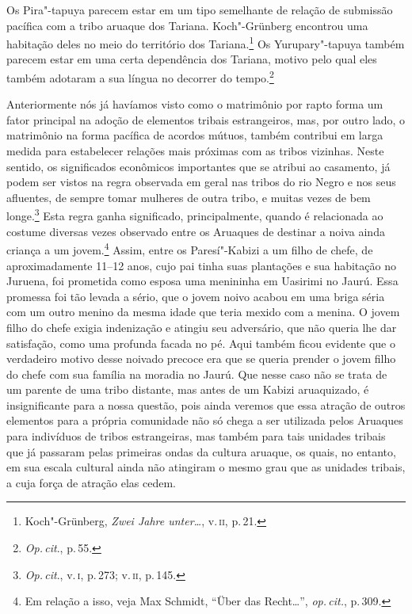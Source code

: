Os Pira"-tapuya parecem estar em um tipo semelhante de relação de
submissão pacífica com a tribo aruaque dos Tariana. Koch"-Grünberg
encontrou uma habitação deles no meio do território dos
Tariana.\footnote{Koch"-Grünberg, \textit{Zwei Jahre unter\ldots},
  v.\,\textsc{ii}, p.\,21.} Os Yurupary"-tapuya também parecem estar em uma certa
dependência dos Tariana, motivo pelo qual eles também adotaram a sua
língua no decorrer do tempo.\footnote{\textit{Op.\,cit}., p.\,55.}

Anteriormente nós já havíamos visto como o matrimônio por rapto forma um
fator principal na adoção de elementos tribais estrangeiros, mas, por
outro lado, o matrimônio na forma pacífica de acordos mútuos, também
contribui em larga medida para estabelecer relações mais próximas com as
tribos vizinhas. Neste sentido, os significados econômicos importantes
que se atribui ao casamento, já podem ser vistos na regra observada em
geral nas tribos do rio Negro e nos seus afluentes, de sempre tomar
mulheres de outra tribo, e muitas vezes de bem longe.\footnote{\textit{Op.\,cit}.,
  v.\,\textsc{i}, p.\,273; v.\,\textsc{ii}, p.\,145.} Esta regra ganha significado,
principalmente, quando é relacionada ao costume diversas vezes observado
entre os Aruaques de destinar a noiva ainda criança a um jovem.\footnote{Em
  relação a isso, veja Max Schmidt, ``Über das Recht\ldots'', \textit{op.\,cit.}, p.\,309.} Assim, entre os
Paresí"-Kabizi a um filho de chefe, de aproximadamente 11--12 anos, cujo
pai tinha suas plantações e sua habitação no Juruena, foi prometida
como esposa uma menininha em Uasirimi no Jaurú. Essa promessa foi tão
levada a sério, que o jovem noivo acabou em uma briga séria com um outro
menino da mesma idade que teria mexido com a menina. O jovem filho do
chefe exigia indenização e atingiu seu adversário, que não queria lhe
dar satisfação, como uma profunda facada no pé. Aqui também ficou
evidente que o verdadeiro motivo desse noivado precoce era que se queria
prender o jovem filho do chefe com sua família na moradia no Jaurú. Que
nesse caso não se trata de um parente de uma tribo distante, mas antes
de um Kabizi aruaquizado, é insignificante para a nossa questão, pois
ainda veremos que essa atração de outros elementos para a própria
comunidade não só chega a ser utilizada pelos Aruaques para indivíduos de
tribos estrangeiras, mas também para tais unidades tribais que já
passaram pelas primeiras ondas da cultura aruaque, os quais, no
entanto, em sua escala cultural ainda não atingiram o mesmo grau que as
unidades tribais, a cuja força de atração elas cedem.

